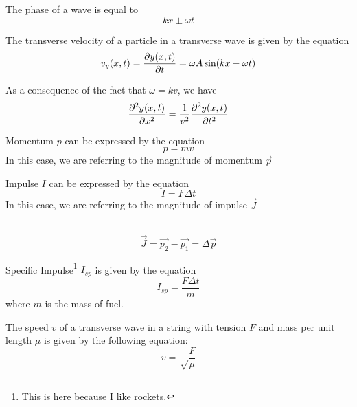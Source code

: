 \documentclass[nobib,notoc]{tufte-handout}
\begin{document}
\begin{defi}[Phase]
	The phase of a wave is equal to
	\begin{equation*}
		kx\pm\omega t
	\end{equation*}
\end{defi}
\begin{defi}
	The transverse velocity of a particle in a transverse wave is given by the equation
	\begin{equation*}
		v_y(x,t)=\pdv{y(x,t)}{t}=\omega A\,\text{sin}(kx-\omega t)
	\end{equation*}
\end{defi}
\begin{defi}
	As a consequence of the fact that \(\omega=kv\), we have
	\begin{equation*}
		\pdv[2]{y(x,t)}{x}=\frac{1}{v^2}\pdv[2]{y(x,t)}{t}
	\end{equation*}
\end{defi}
\begin{defi}[Momentum]
	Momentum \(p\) can be expressed by the equation
	\begin{equation*}
		p=mv
	\end{equation*}
	In this case, we are referring to the magnitude of momentum \(\vec{p}\)
\end{defi}
\begin{defi}[Impulse]
	Impulse \(I\) can be expressed by the equation
	\begin{equation*}
		I=F\Delta t
	\end{equation*}
	In this case, we are referring to the magnitude of impulse \(\vec{J}\)
\end{defi}
\begin{defi}
	\,
	\begin{equation*}	
		\vec{J}=\vec{p_2}-\vec{p_1}=\Delta\vec{p}
	\end{equation*}
\end{defi}
\begin{defi}
	Specific Impulse\footnote{This is here because I like rockets.} \(I_{sp}\) is given by the equation
	\begin{equation*}
		I_{sp}=\frac{F\Delta t}{m}
	\end{equation*}
	where \(m\) is the mass of fuel.
\end{defi}
\begin{defi}
	The speed \(v\) of a transverse wave in a string with tension \(F\) and mass per unit length \(\mu\) is given by the following equation:
	\begin{equation*}
		v=\sqrt\frac{F}{\mu}
	\end{equation*}
\end{defi}
\end{document}
